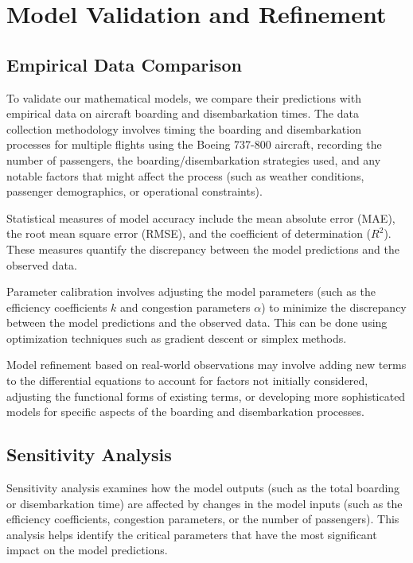 \section{Model Validation and Refinement}
\subsection{Empirical Data Comparison}

To validate our mathematical models, we compare their predictions with empirical data on aircraft boarding and disembarkation times. The data collection methodology involves timing the boarding and disembarkation processes for multiple flights using the Boeing 737-800 aircraft, recording the number of passengers, the boarding/disembarkation strategies used, and any notable factors that might affect the process (such as weather conditions, passenger demographics, or operational constraints).

Statistical measures of model accuracy include the mean absolute error (MAE), the root mean square error (RMSE), and the coefficient of determination ($R^2$). These measures quantify the discrepancy between the model predictions and the observed data.

Parameter calibration involves adjusting the model parameters (such as the efficiency coefficients $k$ and congestion parameters $\alpha$) to minimize the discrepancy between the model predictions and the observed data. This can be done using optimization techniques such as gradient descent or simplex methods.

Model refinement based on real-world observations may involve adding new terms to the differential equations to account for factors not initially considered, adjusting the functional forms of existing terms, or developing more sophisticated models for specific aspects of the boarding and disembarkation processes.

\subsection{Sensitivity Analysis}

Sensitivity analysis examines how the model outputs (such as the total boarding or disembarkation time) are affected by changes in the model inputs (such as the efficiency coefficients, congestion parameters, or the number of passengers). This analysis helps identify the critical parameters that have the most significant impact on the model predictions.

